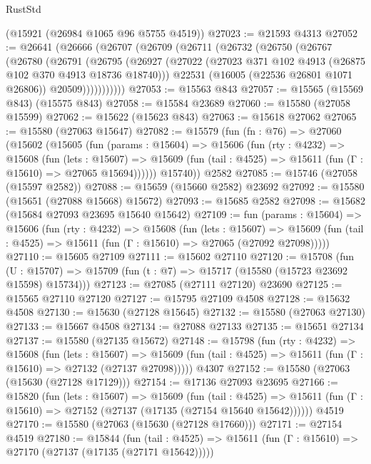 \begin{lexlean}{RustStd}
\begin{coremodule}
    (@15921 (@26984 @1065 @96 @5755 @4519))
@27023 := @21593 @4313
@27052 := @26641
    (@26666
      (@26707
        (@26709
          (@26711
            (@26732
              (@26750
                (@26767
                  (@26780
                    (@26791
                      (@26795
                        (@26927
                          (@27022 (@27023 @371 @102 @4913 (@26875 @102 @370 @4913 @18736 @18740)))
                          @22531
                          (@16005 (@22536 @26801 @1071 @26806))
                          @20509)))))))))))
@27053 := @15563 @843
@27057 := @15565 (@15569 @843) (@15575 @843)
@27058 := @15584 @23689
@27060 := @15580 (@27058 @15599)
@27062 := @15622 (@15623 @843)
@27063 := @15618 @27062
@27065 := @15580 (@27063 @15647)
@27082 := @15579
    (fun (fn : @76) =>
    @27060
      (@15602
        (@15605
          (fun (params : @15604) =>
          @15606
            (fun (rty : @4232) =>
            @15608
              (fun (lets : @15607) =>
              @15609 (fun (tail : @4525) => @15611 (fun (Γ : @15610) => @27065 @15694))))))
        @15740))
    @2582
@27085 := @15746 (@27058 (@15597 @2582))
@27088 := @15659 (@15660 @2582) @23692
@27092 := @15580 (@15651 (@27088 @15668) @15672)
@27093 := @15685 @2582
@27098 := @15682 (@15684 @27093 @23695 @15640 @15642)
@27109 := fun (params : @15604) =>
  @15606
    (fun (rty : @4232) =>
    @15608
      (fun (lets : @15607) =>
      @15609 (fun (tail : @4525) => @15611 (fun (Γ : @15610) => @27065 (@27092 @27098)))))
@27110 := @15605 @27109
@27111 := @15602 @27110
@27120 := @15708
    (fun (U : @15707) => @15709 (fun (t : @7) => @15717 (@15580 (@15723 @23692 @15598) @15734)))
@27123 := @27085 (@27111 @27120) @23690
@27125 := @15565 @27110 @27120
@27127 := @15795 @27109 @4508
@27128 := @15632 @4508
@27130 := @15630 (@27128 @15645)
@27132 := @15580 (@27063 @27130)
@27133 := @15667 @4508
@27134 := @27088 @27133
@27135 := @15651 @27134
@27137 := @15580 (@27135 @15672)
@27148 := @15798
    (fun (rty : @4232) =>
    @15608
      (fun (lets : @15607) =>
      @15609 (fun (tail : @4525) => @15611 (fun (Γ : @15610) => @27132 (@27137 @27098)))))
    @4307
@27152 := @15580 (@27063 (@15630 (@27128 @17129)))
@27154 := @17136 @27093 @23695
@27166 := @15820
    (fun (lets : @15607) =>
    @15609
      (fun (tail : @4525) =>
      @15611 (fun (Γ : @15610) => @27152 (@27137 (@17135 (@27154 @15640 @15642))))))
    @4519
@27170 := @15580 (@27063 (@15630 (@27128 @17660)))
@27171 := @27154 @4519
@27180 := @15844
    (fun (tail : @4525) => @15611 (fun (Γ : @15610) => @27170 (@27137 (@17135 (@27171 @15642)))))

\end{coremodule}
\end{lexlean}
